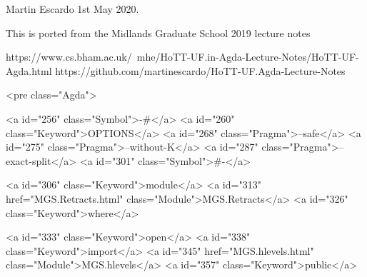 Martin Escardo 1st May 2020.

This is ported from the Midlands Graduate School 2019 lecture notes

 https://www.cs.bham.ac.uk/~mhe/HoTT-UF.in-Agda-Lecture-Notes/HoTT-UF-Agda.html
 https://github.com/martinescardo/HoTT-UF.Agda-Lecture-Notes

<pre class="Agda">

<a id="256" class="Symbol">{-#</a> <a id="260" class="Keyword">OPTIONS</a> <a id="268" class="Pragma">--safe</a> <a id="275" class="Pragma">--without-K</a> <a id="287" class="Pragma">--exact-split</a> <a id="301" class="Symbol">#-}</a>

<a id="306" class="Keyword">module</a> <a id="313" href="MGS.Retracts.html" class="Module">MGS.Retracts</a> <a id="326" class="Keyword">where</a>

<a id="333" class="Keyword">open</a> <a id="338" class="Keyword">import</a> <a id="345" href="MGS.hlevels.html" class="Module">MGS.hlevels</a> <a id="357" class="Keyword">public</a>

